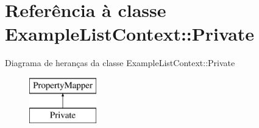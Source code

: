 \hypertarget{class_example_list_context_1_1_private}{\section{Referência à classe Example\-List\-Context\-:\-:Private}
\label{class_example_list_context_1_1_private}
}
Diagrama de heranças da classe Example\-List\-Context\-:\-:Private\begin{figure}[H]
\begin{center}
\leavevmode
\includegraphics[height=2.000000cm]{class_example_list_context_1_1_private}
\end{center}
\end{figure}
